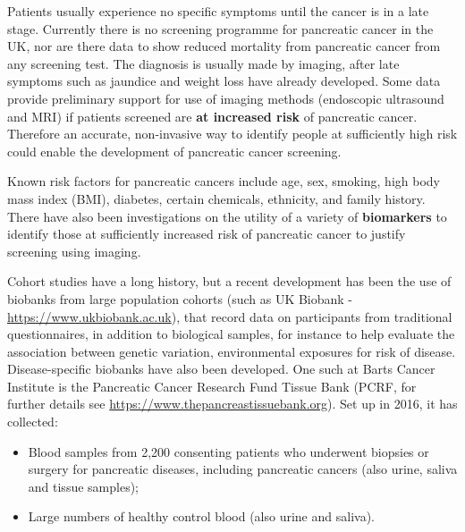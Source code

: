 \documentclass[a4paper,11pt]{scrartcl}
\theoremstyle{plain}
\theoremstyle{remark}
\theoremstyle{definition}
\begin{document}
Patients usually experience no specific symptoms until the cancer is in a late stage. Currently there is no screening programme for pancreatic cancer in the UK, nor are there data to show reduced mortality from pancreatic cancer from any screening test. The diagnosis is usually made by imaging, after late symptoms such as jaundice and weight loss have already developed. Some data provide preliminary support for use of imaging methods (endoscopic ultrasound and MRI) if patients screened are \textbf{at increased risk} of pancreatic cancer. Therefore an accurate, non-invasive way to identify people at sufficiently high risk could enable the development of pancreatic cancer screening. 

\medskip

Known risk factors for pancreatic cancers include age, sex, smoking, high body mass index (BMI),  diabetes, certain chemicals, ethnicity, and family history. There have also been investigations on the utility of a variety of \textbf{biomarkers} to identify those at sufficiently increased risk of pancreatic cancer to justify screening using imaging.

\medskip
Cohort studies have a long history, but a recent development has been the use of biobanks from large population cohorts (such as UK Biobank - \url{https://www.ukbiobank.ac.uk}), that record data on participants from traditional questionnaires, in addition to biological samples, for instance to help evaluate the association between genetic variation, environmental exposures for risk of disease. Disease-specific biobanks have also been developed. One such at Barts Cancer Institute is the Pancreatic Cancer Research Fund Tissue Bank (PCRF, for further details see \url{https://www.thepancreastissuebank.org}). Set up in 2016, it has collected:
\begin{itemize}
\item Blood samples from 2,200 consenting patients who underwent biopsies or surgery for pancreatic diseases, including pancreatic cancers (also urine, saliva and tissue samples);
\item Large numbers of healthy control blood (also urine and saliva).
\end{itemize}
\end{document}
